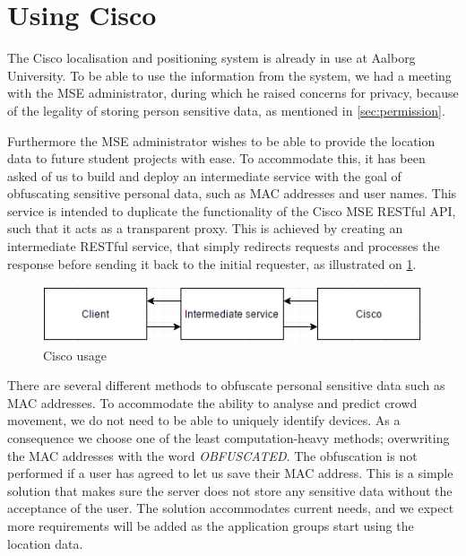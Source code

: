 \section{Using Cisco}\label{sec:cisco_usage}
The Cisco localisation and positioning system is already in use at Aalborg University. To be able to use the information from the system, we had a meeting with the MSE administrator, during which he raised concerns for privacy, because of the legality of storing person sensitive data, as mentioned in \cref{sec:permission}. 

Furthermore the MSE administrator wishes to be able to provide the location data to future student projects with ease. To accommodate this, it has been asked of us to build and deploy an intermediate service with the goal of obfuscating sensitive personal data, such as MAC addresses and user names. This service is intended to duplicate the functionality of the Cisco MSE RESTful API, such that it acts as a transparent proxy. This is achieved by creating an intermediate RESTful service, that simply redirects requests and processes the response before sending it back to the initial requester, as illustrated on \cref{fig:cisco_usage}.

\begin{figure}[ht]
	\begin{center}
	\includegraphics[scale=0.9]{graphics/cisco_usage.png}
	\caption{Cisco usage}
	\label{fig:cisco_usage}
	\end{center} 
\end{figure}

There are several different methods to obfuscate personal sensitive data such as MAC addresses. To accommodate the ability to analyse and predict crowd movement, we do not need to be able to uniquely identify devices. As a consequence we choose one of the least computation-heavy methods; overwriting the MAC addresses with the word \emph{OBFUSCATED}. The obfuscation is not performed if a user has agreed to let us save their MAC address.
This is a simple solution that makes sure the server does not store any sensitive data without the acceptance of the user. The solution accommodates current needs, and we expect more requirements will be added as the application groups start using the location data.

